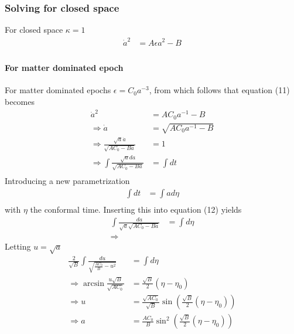\documentclass[a4paper, 11pt]{FSKH_623_Report}
\numberwithin{equation}{section}
\newcommand{\brac}[1]{\left(#1\right)}
\begin{document}
\subsubsection*{Solving for closed space}
For closed space $\kappa=1$
\begin{equation}
\begin{split}
\dot{a}^{2} &= A\epsilon a^{2}-B\\
\end{split}
\end{equation}
\paragraph*{For matter dominated epoch}
For matter dominated epochs $\epsilon=C_{0}a^{-3}$, from which follows that equation (11) becomes
\begin{equation}
\begin{split}
\dot{a}^{2} &= AC_{0} a^{-1}-B\\
\Rightarrow \dot{a} &= \sqrt{AC_{0} a^{-1}-B}\\
\Rightarrow \frac{\sqrt{a}\dot{a}}{\sqrt{{AC_{0}-Ba}}} &= 1\\
\Rightarrow \int\frac{\sqrt{a}da}{\sqrt{AC_{0}-Ba}} &= \int dt\\
\end{split}
\end{equation}
Introducing a new parametrization
\begin{equation}
\begin{split}
\int dt &= \int ad\eta\\
\end{split}
\end{equation}
with $\eta$ the conformal time. Inserting this into equation (12) yields
\begin{equation}
\begin{split}
\int\frac{da}{\sqrt{a}\sqrt{AC_{0}-Ba}} &= \int d\eta\\
\Rightarrow 
\end{split}
\end{equation}
Letting $u=\sqrt{a}$
\begin{equation}
\begin{split}
\frac{2}{\sqrt{B}}\int\frac{du}{\sqrt{\frac{AC_{0}}{B}-u^{2}}} &= \int d\eta\\
\Rightarrow \arcsin\frac{u\sqrt{B}}{\sqrt{AC_{0}}} &= \frac{\sqrt{B}}{2}\brac{\eta-\eta_{0}}\\
\Rightarrow u &= \frac{\sqrt{AC_{0}}}{\sqrt{B}}\sin\brac{\frac{\sqrt{B}}{2}\brac{\eta-\eta_{0}}}\\
\Rightarrow a &= \frac{AC_{0}}{B}\sin^{2}\brac{\frac{\sqrt{B}}{2}\brac{\eta-\eta_{0}}}\\
\end{split}
\end{equation}
\end{document}

